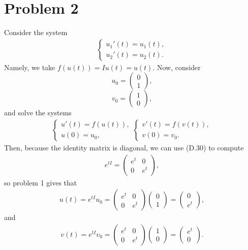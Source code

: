 \documentclass{article}
\begin{document}
\section{Problem 2}
Consider the system 
\begin{align*}
	\begin{cases}
		u_1'(t) = u_1(t),\\
		u_2'(t) = u_2(t). 
	\end{cases}
\end{align*}
Namely, we take $f(u(t))=Iu(t)=u(t)$. Now, consider 
\[
u_0=\begin{pmatrix}
	0\\1
\end{pmatrix},
\]
\[
v_0=\begin{pmatrix}
	1\\0
\end{pmatrix},
\]
and solve the systems 
  \begin{align*}
	\begin{cases}
		u'(t) = f(u(t)),\\
		u(0) = u_0,
	\end{cases}
	\begin{cases}
		v'(t) = f(v(t)),\\
		v(0) = v_0.
	\end{cases}
\end{align*}
Then, because the identity matrix is diagonal, we can use (D.30) to compute 
\begin{align*}
e^{tI}=\begin{pmatrix}
	e^{t} &0\\
	0 &e^t
\end{pmatrix},
\end{align*}
so problem 1 gives that 
\begin{align*}
	u(t)=e^{tI}u_0=\begin{pmatrix}
		e^{t} &0\\
		0 &e^t
	\end{pmatrix}\begin{pmatrix}
	0\\1
\end{pmatrix}=\begin{pmatrix}
0\\e^t
\end{pmatrix},
\end{align*}
and 
\begin{align*}
	v(t)=e^{tI}v_0=\begin{pmatrix}
	e^{t} &0\\
	0 &e^t
\end{pmatrix}\begin{pmatrix}
	1\\0
\end{pmatrix}=\begin{pmatrix}
	e^t\\0
\end{pmatrix}. 
\end{align*}
\end{document}
